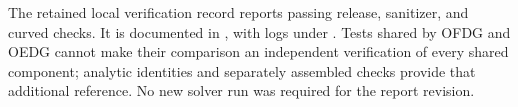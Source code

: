 The retained local verification record reports passing release, sanitizer, and
curved checks. It is documented in , with logs
under . Tests shared by OFDG and OEDG cannot make
their comparison an independent verification of every shared component;
analytic identities and separately assembled checks provide that additional
reference. No new solver run was required for the report revision.
